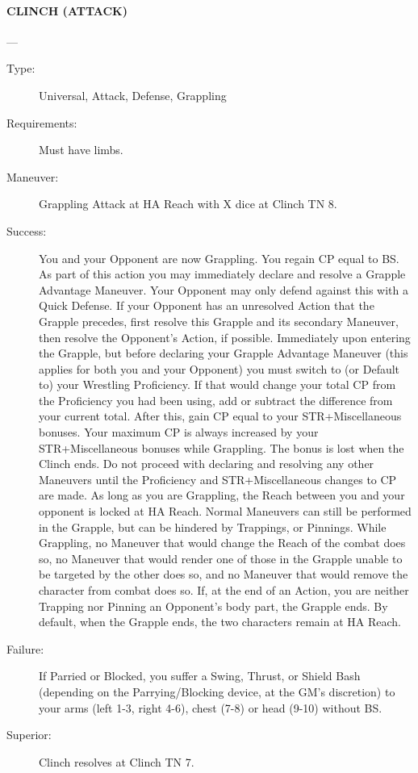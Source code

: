 \documentclass[oneside,11pt,english]{book}
\begin{document}
\paragraph{\large\label{man:CLINCH (ATTACK)} CLINCH (ATTACK)}---\quad{\large[X]}
\vspace{-10pt}\begin{description} 
\item [Type:] Universal, Attack, Defense, Grappling 
\item [Requirements:] Must have limbs. 
\item [Maneuver:] Grappling Attack at HA Reach with X dice at Clinch TN 8. 
\item [Success:] You and your Opponent are now Grappling. You regain CP equal to BS. As part of this action 
you may immediately declare and resolve a Grapple Advantage Maneuver. Your Opponent may only 
defend against this with a Quick Defense. If your Opponent has an unresolved Action that the Grapple 
precedes, first resolve this Grapple and its secondary Maneuver, then resolve the Opponent’s Action, if 
possible. 
Immediately upon entering the Grapple, but before declaring your Grapple Advantage Maneuver (this 
applies for both you and your Opponent) you must switch to (or Default to) your Wrestling Proficiency. If 
that would change your total CP from the Proficiency you had been using, add or subtract the difference 
from your current total. After this, gain CP equal to your STR+Miscellaneous bonuses. Your maximum 
CP is always increased by your STR+Miscellaneous bonuses while Grappling. The bonus is lost when the 
Clinch ends. 
Do not proceed with declaring and resolving any other Maneuvers until the Proficiency and 
STR+Miscellaneous changes to CP are made. 
As long as you are Grappling, the Reach between you and your opponent is locked at HA Reach. Normal 
Maneuvers can still be performed in the Grapple, but can be hindered by Trappings, or Pinnings. 
While Grappling, no Maneuver that would change the Reach of the combat does so, no Maneuver that 
would render one of those in the Grapple unable to be targeted by the other does so, and no Maneuver that 
would remove the character from combat does so. 
If, at the end of an Action, you are neither Trapping nor Pinning an Opponent's body part, the Grapple 
ends. By default, when the Grapple ends, the two characters remain at HA Reach. 
\item [Failure:] If Parried or Blocked, you suffer a Swing, Thrust, or Shield Bash (depending on the Parrying/Blocking device, at the GM's discretion) to your arms (left 1-3, right 4-6), chest (7-8) or head (9-10) without BS.
\item [Superior:] Clinch resolves at Clinch TN 7. 
\end{description}
\end{document}
